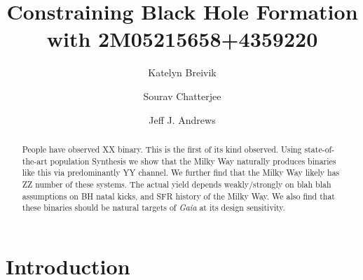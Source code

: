 \documentclass[twocolumn,tighten]{aastex61}
\newcommand{\gaia}{{\it Gaia} }
\begin{document}
\title{Constraining Black Hole Formation with 2M05215658+4359220}

\author[0000-0002-9660-9085]{Katelyn Breivik}


\author[0000-0002-3680-2684]{Sourav Chatterjee}

\author[0000-0001-5261-3923]{Jeff J. Andrews}

\begin{abstract}
People have observed XX binary. This is the first of its kind observed. Using state-of-the-art population Synthesis we show that the Milky Way naturally produces binaries like this via predominantly YY channel. We further find that the Milky Way likely has ZZ number of these systems. The actual yield depends weakly/strongly on blah blah assumptions on BH natal kicks, and SFR history of the Milky Way. We also find that these binaries should be natural targets of \gaia at its design sensitivity. 
\end{abstract}

\keywords{}

\section{Introduction}\label{S:intro}
%
\end{document}
